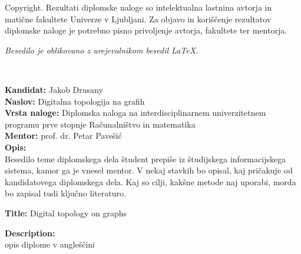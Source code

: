 \documentclass[a4paper, 12pt]{book}
\newcommand{\clearemptydoublepage}{\newpage{\pagestyle{empty}\cleardoublepage}}
\theoremstyle{definition}
\theoremstyle{remark}
\begin{document}
\thispagestyle{empty}
\vspace*{8cm}

\noindent
{\sc Copyright}. 
Rezultati diplomske naloge so intelektualna lastnina avtorja in matične fakultete Univerze v Ljubljani.
Za objavo in koriščenje rezultatov diplomske naloge je potrebno pisno privoljenje avtorja, fakultete ter mentorja.

\begin{center}
\mbox{}\vfill
\emph{Besedilo je oblikovano z urejevalnikom besedil \LaTeX.}
\end{center}
\clearemptydoublepage

\thispagestyle{empty}
\
\vfill

\bigskip
\noindent\textbf{Kandidat:} Jakob Drusany\\
\noindent\textbf{Naslov:} Digitalna topologija na grafih\\
\noindent\textbf{Vrsta naloge:} Diplomska naloga na interdisciplinarnem univerzitetnem programu prve stopnje Računalništvo in matematika\\
\noindent\textbf{Mentor:} prof. dr. Petar Pavešić\\

\bigskip
\noindent\textbf{Opis:}\\
Besedilo teme diplomskega dela študent prepiše iz študijskega informacijskega sistema, kamor ga je vnesel mentor. 
V nekaj stavkih bo opisal, kaj pričakuje od kandidatovega diplomskega dela. 
Kaj so cilji, kakšne metode naj uporabi, morda bo zapisal tudi ključno literaturo.

\bigskip
\noindent\textbf{Title:} Digital topology on graphs

\bigskip
\noindent\textbf{Description:}\\
opis diplome v angleščini

\vfill



\vspace{2cm}


\end{document}
